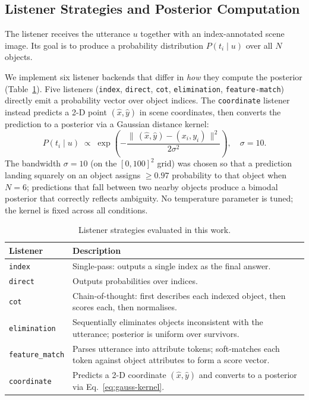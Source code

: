 \subsection{Listener Strategies and Posterior Computation}
\label{sec:listeners}

The listener receives the utterance $u$ together with an index-annotated scene
image.  Its goal is to produce a probability distribution $P(t_i\mid u)$ over all $N$
objects.

We implement six listener backends that differ in \emph{how} they compute
the posterior (Table~\ref{tab:listeners}).  Five listeners
(\texttt{index}, \texttt{direct}, \texttt{cot}, \texttt{elimination},
\texttt{feature-match}) directly emit a probability vector over object indices.
The \texttt{coordinate} listener instead predicts a 2-D point $(\hat{x},
\hat{y})$ in scene coordinates, then converts the prediction to a posterior via
a Gaussian distance kernel:
\begin{equation}
  P(t_i\mid u) \;\propto\;
  \exp\!\left(-\frac{\|\,(\hat{x},\hat{y}) - (x_i,y_i)\,\|^2}{2\sigma^2}\right),
  \quad \sigma = 10.
  \label{eq:gauss-kernel}
\end{equation}
The bandwidth $\sigma{=}10$ (on the $[0,100]^2$ grid) was chosen so that a
prediction landing squarely on an object assigns $\geq 0.97$ probability to
that object when $N{=}6$; predictions that fall between two nearby objects
produce a bimodal posterior that correctly reflects ambiguity.  No temperature
parameter is tuned; the kernel is fixed across all conditions.

\begin{table}[H]
\centering
\small
\begin{tabular}{lp{10.8cm}}
\toprule
\textbf{Listener} & \textbf{Description} \\
\midrule
\texttt{index} & Single-pass: outputs a single index as the final answer. \\[4pt]
\texttt{direct} & Outputs probabilities over indices. \\[4pt]
\texttt{cot} & Chain-of-thought: first describes each indexed object, then scores each, then normalises. \\[4pt]
\texttt{elimination} & Sequentially eliminates objects inconsistent with the utterance; posterior is uniform over survivors. \\[4pt]
\texttt{feature\_match} & Parses utterance into attribute tokens; soft-matches each token against object attributes to form a score vector. \\[4pt]
\texttt{coordinate} & Predicts a 2-D coordinate $(\hat x, \hat y)$ and converts to a posterior via Eq.~\ref{eq:gauss-kernel}. \\
\bottomrule
\end{tabular}
\caption{Listener strategies evaluated in this work.}
\label{tab:listeners}
\end{table}

